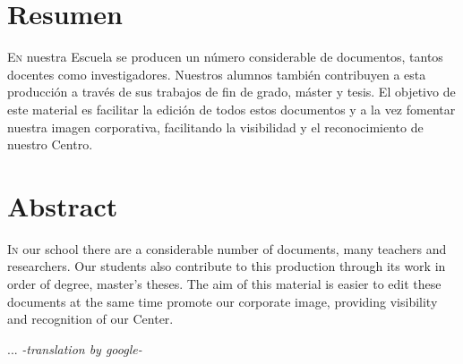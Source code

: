 \chapter*{Resumen}
\pagestyle{especial}
{}

\lettrine[lraise=-0.1, lines=2, loversize=0.2]{E}{n} nuestra Escuela se producen un número considerable de documentos, tantos docentes como investigadores. Nuestros alumnos también contribuyen a esta producción a través de sus trabajos de fin de grado, máster y tesis. El objetivo de este material es facilitar la edición de todos estos documentos y a la vez fomentar nuestra imagen corporativa, facilitando la visibilidad y el reconocimiento de nuestro Centro.



\chapter*{Abstract}
\pagestyle{especial}
{}

\lettrine[lraise=-0.1, lines=2, loversize=0.2]{I}{n} our school there are a considerable number of documents, many teachers and researchers. Our students also contribute to this production through its work in order of degree, master's theses. The aim of this material is easier to edit these documents at the same time promote our corporate image, providing visibility and recognition of our Center. 

...
\emph{-translation by google-}

